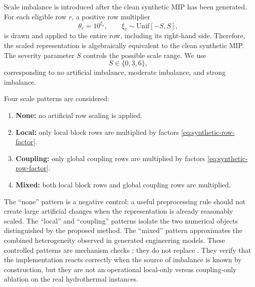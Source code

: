 \documentclass[AMA,Times1COL]{WileyNJDv5} %
\providecommand{\DIFadd}[1]{{\protect\color{blue} \sf #1}} %
\providecommand{\DIFdel}[1]{{\protect\color{red} \scriptsize #1}} %
\providecommand{\DIFaddbegin}{} %
\providecommand{\DIFaddend}{} %
\providecommand{\DIFdelbegin}{} %
\providecommand{\DIFdelend}{} %
\begin{document}
Scale imbalance is introduced after the clean synthetic MIP has been generated. For each
eligible row $r$, a positive row multiplier
\begin{equation}
\theta_r = 10^{\xi_r},
\qquad
\xi_r\sim\mathrm{Unif}[-S,S],
\label{eq:synthetic-row-factor}
\end{equation}
is drawn and applied to the entire row, including its right-hand side. Therefore, the
scaled representation is algebraically equivalent to the clean synthetic MIP. The severity
parameter $S$ controls the possible scale range. We use
\begin{equation}
S\in\{0,3,6\},
\label{eq:synthetic-severity}
\end{equation}
corresponding to no artificial imbalance, moderate imbalance, and strong imbalance.

Four scale patterns are considered:
\DIFdelbegin %
\DIFdelend \DIFaddbegin \begin{enumerate}
  \DIFaddend \item \textbf{None:} no artificial row scaling is applied.
  \item \textbf{Local:} only local block rows are multiplied by factors
  \eqref{eq:synthetic-row-factor}.
  \item \textbf{Coupling:} only global coupling rows are multiplied by factors
  \eqref{eq:synthetic-row-factor}.
  \item \textbf{Mixed:} both local block rows and global coupling rows are multiplied.
\end{enumerate}
The ``none'' pattern is a negative control: a useful preprocessing rule should not create
large artificial changes when the representation is already reasonably scaled. The
``local'' and ``coupling'' patterns isolate the two numerical objects distinguished by the
proposed method. The ``mixed'' pattern approximates the combined heterogeneity observed in
generated \DIFdelbegin \DIFdel{engineering }\DIFdelend models. These controlled patterns are mechanism checks\DIFdelbegin \DIFdel{; they do not replace }\DIFdelend \DIFaddbegin \DIFadd{. They verify that the implementation reacts correctly when the source of imbalance is known by construction, but they are not }\DIFaddend an operational local-only versus coupling-only ablation on the real hydrothermal instances.
\end{document}
